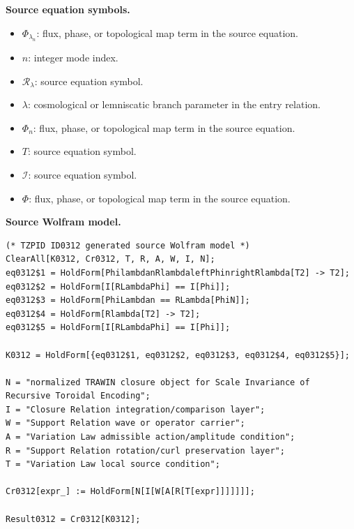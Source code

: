 \begin{minipage}[t]{0.49\linewidth}
\begingroup
\small
\raggedright
\textbf{Source equation symbols.}\par
\begin{itemize}[leftmargin=1.35em,itemsep=1pt,topsep=1pt,parsep=0pt]
    \item $\Phi_{\lambda_{n}}$: flux, phase, or topological map term in the source equation.
    \item $n$: integer mode index.
    \item $\mathcal{R}_{\lambda}$: source equation symbol.
    \item $\lambda$: cosmological or lemniscatic branch parameter in the entry relation.
    \item $\Phi_{n}$: flux, phase, or topological map term in the source equation.
    \item $T$: source equation symbol.
    \item $\mathcal{I}$: source equation symbol.
    \item $\Phi$: flux, phase, or topological map term in the source equation.
\end{itemize}
\endgroup
\end{minipage}\hfill
\begin{minipage}[t]{0.47\linewidth}
\begingroup
\scriptsize
\raggedright
\textbf{Source Wolfram model.}\par
\begin{Verbatim}[fontsize=\tiny,breaklines=true,breakanywhere=true]
(* TZPID ID0312 generated source Wolfram model *)
ClearAll[K0312, Cr0312, T, R, A, W, I, N];
eq0312$1 = HoldForm[PhilambdanRlambdaleftPhinrightRlambda[T2] -> T2];
eq0312$2 = HoldForm[I[RLambdaPhi] == I[Phi]];
eq0312$3 = HoldForm[PhiLambdan == RLambda[PhiN]];
eq0312$4 = HoldForm[Rlambda[T2] -> T2];
eq0312$5 = HoldForm[I[RLambdaPhi] == I[Phi]];

K0312 = HoldForm[{eq0312$1, eq0312$2, eq0312$3, eq0312$4, eq0312$5}];

N = "normalized TRAWIN closure object for Scale Invariance of Recursive Toroidal Encoding";
I = "Closure Relation integration/comparison layer";
W = "Support Relation wave or operator carrier";
A = "Variation Law admissible action/amplitude condition";
R = "Support Relation rotation/curl preservation layer";
T = "Variation Law local source condition";

Cr0312[expr_] := HoldForm[N[I[W[A[R[T[expr]]]]]]];

Result0312 = Cr0312[K0312];
\end{Verbatim}
\endgroup
\end{minipage}


